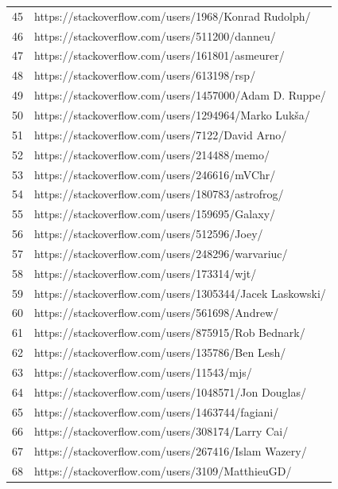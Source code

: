 \begin{center}
\begin{longtable}{|p{1.5cm}|p{12.5cm}|}
            45 & https://stackoverflow.com/users/1968/Konrad Rudolph/ \\
            46 & https://stackoverflow.com/users/511200/danneu/ \\
            47 & https://stackoverflow.com/users/161801/asmeurer/ \\
            48 & https://stackoverflow.com/users/613198/rsp/ \\
            49 & https://stackoverflow.com/users/1457000/Adam D. Ruppe/ \\
            50 & https://stackoverflow.com/users/1294964/Marko Lukša/ \\
            51 & https://stackoverflow.com/users/7122/David Arno/ \\
            52 & https://stackoverflow.com/users/214488/memo/ \\
            53 & https://stackoverflow.com/users/246616/mVChr/ \\
            54 & https://stackoverflow.com/users/180783/astrofrog/ \\
            55 & https://stackoverflow.com/users/159695/Galaxy/ \\
            56 & https://stackoverflow.com/users/512596/Joey/ \\
            57 & https://stackoverflow.com/users/248296/warvariuc/ \\
            58 & https://stackoverflow.com/users/173314/wjt/ \\
            59 & https://stackoverflow.com/users/1305344/Jacek Laskowski/ \\
            60 & https://stackoverflow.com/users/561698/Andrew/ \\
            61 & https://stackoverflow.com/users/875915/Rob Bednark/ \\
            62 & https://stackoverflow.com/users/135786/Ben Lesh/ \\
            63 & https://stackoverflow.com/users/11543/mjs/ \\
            64 & https://stackoverflow.com/users/1048571/Jon Douglas/ \\
            65 & https://stackoverflow.com/users/1463744/fagiani/ \\
            66 & https://stackoverflow.com/users/308174/Larry Cai/ \\
            67 & https://stackoverflow.com/users/267416/Islam Wazery/ \\
            68 & https://stackoverflow.com/users/3109/MatthieuGD/ \\

\end{longtable}
\end{center}
